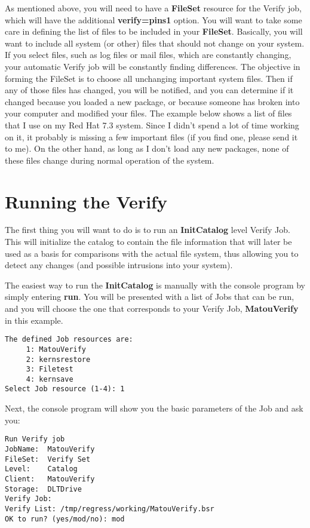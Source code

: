 As mentioned above, you will need to have a {\bf FileSet} resource for the
Verify job, which will have the additional {\bf verify=pins1} option. You will
want to take some care in defining the list of files to be included in your
{\bf FileSet}. Basically, you will want to include all system (or other) files
that should not change on your system. If you select files, such as log files
or mail files, which are constantly changing, your automatic Verify job will
be constantly finding differences. The objective in forming the FileSet is to
choose all unchanging important system files. Then if any of those files has
changed, you will be notified, and you can determine if it changed because you
loaded a new package, or because someone has broken into your computer and
modified your files. The example below shows a list of files that I use on my
Red Hat 7.3 system. Since I didn't spend a lot of time working on it, it
probably is missing a few important files (if you find one, please send it to
me). On the other hand, as long as I don't load any new packages, none of
these files change during normal operation of the system.

\section{Running the Verify}

The first thing you will want to do is to run an {\bf InitCatalog} level
Verify Job. This will initialize the catalog to contain the file information
that will later be used as a basis for comparisons with the actual file
system, thus allowing you to detect any changes (and possible intrusions into
your system).

The easiest way to run the {\bf InitCatalog} is manually with the console
program by simply entering {\bf run}. You will be presented with a list of
Jobs that can be run, and you will choose the one that corresponds to your
Verify Job, {\bf MatouVerify} in this example.

\footnotesize
\begin{verbatim}
The defined Job resources are:
     1: MatouVerify
     2: kernsrestore
     3: Filetest
     4: kernsave
Select Job resource (1-4): 1
\end{verbatim}
\normalsize

Next, the console program will show you the basic parameters of the Job and
ask you:

\footnotesize
\begin{verbatim}
Run Verify job
JobName:  MatouVerify
FileSet:  Verify Set
Level:    Catalog
Client:   MatouVerify
Storage:  DLTDrive
Verify Job:
Verify List: /tmp/regress/working/MatouVerify.bsr
OK to run? (yes/mod/no): mod
\end{verbatim}
\normalsize

